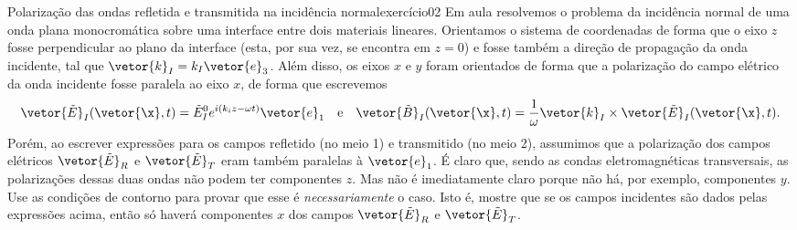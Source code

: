 \begin{exercício}{Polarização das ondas refletida e transmitida na incidência normal}{exercício02}
    Em aula resolvemos o problema da incidência normal de uma onda plana monocromática sobre uma interface entre dois materiais lineares. Orientamos o sistema de coordenadas de forma que o eixo \(z\) fosse perpendicular ao plano da interface (esta, por sua vez, se encontra em \(z = 0\)) e fosse também a direção de propagação da onda incidente, tal que \(\vetor{k}_I = k_I \vetor{e}_3\). Além disso, os eixos \(x\) e \(y\) foram orientados de forma que a polarização do campo elétrico da onda incidente fosse paralela ao eixo \(x\), de forma que escrevemos
    \begin{equation*}
        \vetor{\tilde{E}}_I(\vetor{\x},t) = \tilde{E}^0_I e^{i(k_i z - \omega t)}\vetor{e}_1\quad\text{e}\quad
        \vetor{\tilde{B}}_I(\vetor{\x}, t) = \frac{1}{\omega} \vetor{k}_I \times \vetor{\tilde{E}}_I(\vetor{\x},t).
    \end{equation*}
    Porém, ao escrever expressões para os campos refletido (no meio 1) e transmitido (no meio 2), assumimos que a polarização dos campos elétricos \(\vetor{\tilde{E}}_R\) e \(\vetor{\tilde{E}}_T\) eram também paralelas à \(\vetor{e}_1\). É claro que, sendo as condas eletromagnéticas transversais, as polarizações dessas duas ondas não podem ter componentes \(z\). Mas não é imediatamente claro porque não há, por exemplo, componentes \(y\). Use as condições de contorno para provar que esse é \emph{necessariamente} o caso. Isto é, mostre que se os campos incidentes são dados pelas expressões acima, então só haverá componentes \(x\) dos campos \(\vetor{\tilde{E}}_R\) e \(\vetor{\tilde{E}}_T\).
\end{exercício}
